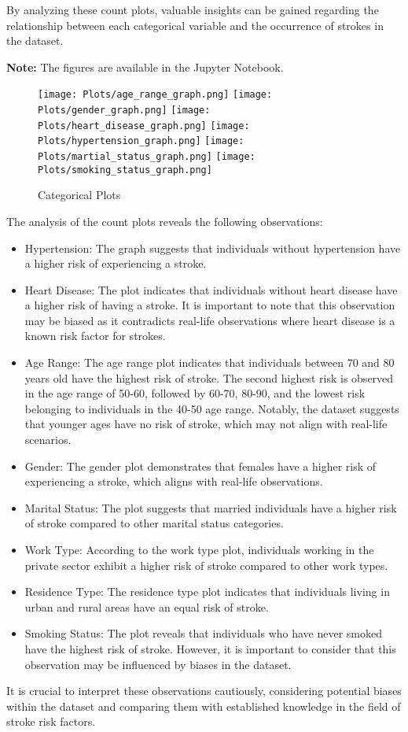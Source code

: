 \documentclass{article}
\begin{document}
By analyzing these count plots, valuable insights can be gained regarding the relationship between each categorical variable and the occurrence of strokes in the dataset.

\textbf{Note:} The figures are available in the Jupyter Notebook.

\begin{figure}[H]
  \centering
  \texttt{[image: Plots/age\_range\_graph.png]}
  \texttt{[image: Plots/gender\_graph.png]}
  \texttt{[image: Plots/heart\_disease\_graph.png]}
  \texttt{[image: Plots/hypertension\_graph.png]}
  \texttt{[image: Plots/martial\_status\_graph.png]}
  \texttt{[image: Plots/smoking\_status\_graph.png]}

  \caption{Categorical Plots}
  \label{fig:image}
\end{figure}

The analysis of the count plots reveals the following observations:
\begin{itemize}
  \item Hypertension: The graph suggests that individuals without hypertension have a higher risk of experiencing a stroke.
  \item Heart Disease: The plot indicates that individuals without heart disease have a higher risk of having a stroke. It is important to note that this observation may be biased as it contradicts real-life observations where heart disease is a known risk factor for strokes.
  \item Age Range: The age range plot indicates that individuals between 70 and 80 years old have the highest risk of stroke. The second highest risk is observed in the age range of 50-60, followed by 60-70, 80-90, and the lowest risk belonging to individuals in the 40-50 age range. Notably, the dataset suggests that younger ages have no risk of stroke, which may not align with real-life scenarios.
  \item Gender: The gender plot demonstrates that females have a higher risk of experiencing a stroke, which aligns with real-life observations.
  \item Marital Status: The plot suggests that married individuals have a higher risk of stroke compared to other marital status categories.
  \item Work Type: According to the work type plot, individuals working in the private sector exhibit a higher risk of stroke compared to other work types.
  \item Residence Type: The residence type plot indicates that individuals living in urban and rural areas have an equal risk of stroke.
  \item Smoking Status: The plot reveals that individuals who have never smoked have the highest risk of stroke. However, it is important to consider that this observation may be influenced by biases in the dataset.
\end{itemize}
It is crucial to interpret these observations cautiously, considering potential biases within the dataset and comparing them with established knowledge in the field of stroke risk factors.
\end{document}
